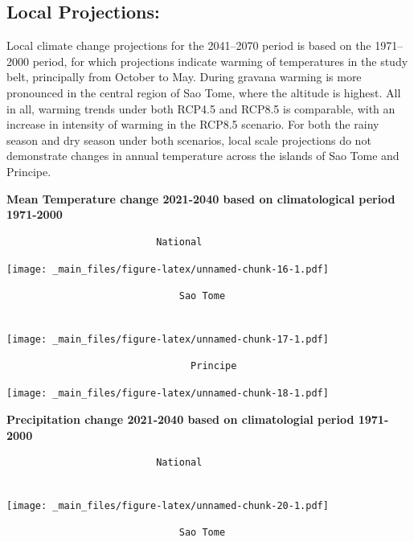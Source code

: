 \documentclass[
]{book}
\begin{document}
\hypertarget{local-projections}{%
\subsection{Local Projections:}\label{local-projections}}

Local climate change projections for the 2041--2070 period is based on the 1971--2000 period, for which projections indicate warming of temperatures in the study belt, principally from October to May. During gravana warming is more pronounced in the central region of Sao Tome, where the altitude is highest. All in all, warming trends under both RCP4.5 and RCP8.5 is comparable, with an increase in intensity of warming in the RCP8.5 scenario. For both the rainy season and dry season under both scenarios, local scale projections do not demonstrate changes in annual temperature across the islands of Sao Tome and Principe.

\textbf{Mean Temperature change 2021-2040 based on climatological period 1971-2000}

\begin{verbatim}
                          National 
\end{verbatim}

\texttt{[image: \_main\_files/figure-latex/unnamed-chunk-16-1.pdf]}

\begin{verbatim}
                              Sao Tome 
                              
\end{verbatim}

\texttt{[image: \_main\_files/figure-latex/unnamed-chunk-17-1.pdf]}

\begin{verbatim}
                                Principe
\end{verbatim}

\texttt{[image: \_main\_files/figure-latex/unnamed-chunk-18-1.pdf]}

\textbf{Precipitation change 2021-2040 based on climatologial period 1971-2000}

\begin{verbatim}
                          National
                          
\end{verbatim}

\texttt{[image: \_main\_files/figure-latex/unnamed-chunk-20-1.pdf]}

\begin{verbatim}
                              Sao Tome
\end{verbatim}
\end{document}
